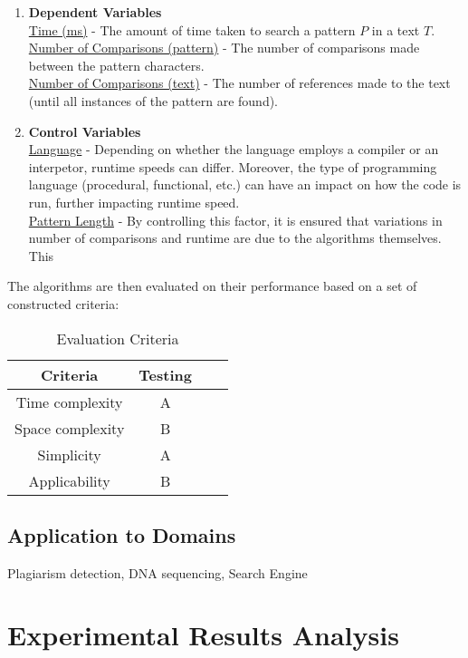 \documentclass[12pt]{article}
\begin{document}
\begin{enumerate}
	\item \textbf{Dependent Variables} \\
	\underline{Time (ms)} - The amount of time taken to search a pattern $P$ in a text $T$. \\
	\underline{Number of Comparisons (pattern)} - The number of comparisons made between the pattern characters. \\
	\underline{Number of Comparisons (text)} - The number of references made to the text (until all instances of the pattern are found).
	\item \textbf{Control Variables} \\
	\underline{Language} - Depending on whether the language employs a compiler or an interpetor, runtime speeds can differ. Moreover, the type of programming language (procedural, functional, etc.) can have an impact on how the code is run, further impacting runtime speed.\\
	\underline{Pattern Length} - By controlling this factor, it is ensured that variations in number of comparisons and runtime are due to the algorithms themselves. This 
\end{enumerate}

The algorithms are then evaluated on their performance based on a set of constructed criteria:

\begin{table}[!htbp]
    \centering
    \begin{tabular}{|c|c|c|c|}
        \hline
        Criteria & Testing \\
        \hline
        Time complexity & A \\
        Space complexity & B \\
        Simplicity & A \\
        Applicability & B \\
        \hline
    \end{tabular}
    \caption{Evaluation Criteria}
\end{table}

\subsection{Application to Domains}
Plagiarism detection, DNA sequencing, Search Engine

\section{Experimental Results Analysis}
\end{document}
